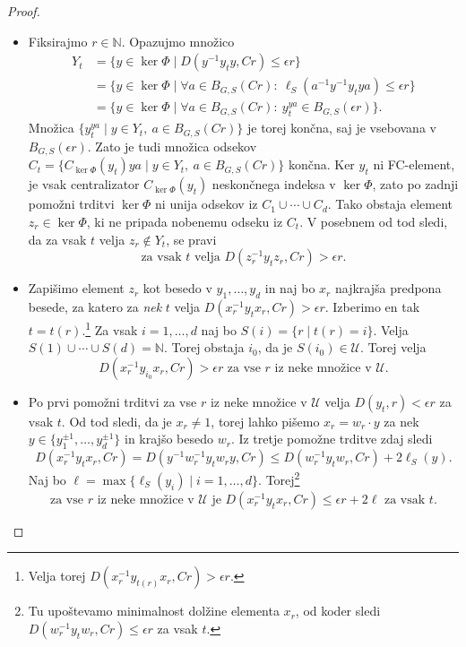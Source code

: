 \documentclass[11pt]{book}
\def\NN{\mathbb{N}}
\def\UU{\mathcal{U}}
\theoremstyle{definition}
\theoremstyle{zgled}
\theoremstyle{odprtproblem}
\theoremstyle{domacanaloga}
\newenvironment{dokaz}
    {\color{siva}\begin{proof}}
    {\end{proof}}
\theoremstyle{izrek}
\begin{document}
\begin{dokaz}
\begin{itemize}
    \item Fiksirajmo $r \in \NN$.  Opazujmo množico
    \begin{align*}
    Y_t &= \{ y \in \ker \Phi \mid D(y^{-1} y_t y, Cr) \leq \epsilon r \} \\
    &= \{ y \in \ker \Phi \mid \forall a \in B_{G,S}(Cr) \colon \ \ell_S(a^{-1} y^{-1} y_t y a) \leq \epsilon r \} \\
    &= \{ y \in \ker \Phi \mid \forall a \in B_{G,S}(Cr) \colon \ y_t^{ya} \in B_{G,S}(\epsilon r) \}.
    \end{align*}
    Množica $\{ y_t^{ya} \mid y \in Y_t, \ a \in B_{G,S}(Cr) \}$ je torej končna, saj je vsebovana v $B_{G,S}(\epsilon r)$. Zato je tudi množica odsekov $C_t = \{ C_{\ker \Phi}(y_t) ya \mid y \in Y_t, \ a \in B_{G,S}(Cr) \}$ končna. Ker $y_t$ ni FC-element, je vsak centralizator $C_{\ker \Phi}(y_t)$ neskončnega indeksa v $\ker \Phi$, zato po zadnji pomožni trditvi $\ker \Phi$ ni unija odsekov iz $C_1 \cup \cdots \cup C_d$. Tako obstaja element $z_r \in \ker \Phi$, ki ne pripada nobenemu odseku iz $C_t$. V posebnem od tod sledi, da za vsak $t$ velja $z_r \notin Y_t$, se pravi 
    \[
    \text{za vsak $t$ velja $D(z_r^{-1} y_t z_r, Cr) > \epsilon r$.}
    \]

    \item Zapišimo element $z_r$ kot besedo v $y_1, \dots, y_d$ in naj bo $x_r$ najkrajša predpona besede, za katero za {\em nek} $t$ velja $D(x_r^{-1} y_t x_r, Cr) > \epsilon r$. Izberimo en tak $t = t(r)$.\footnote{Velja torej $D(x_r^{-1} y_{t(r)} x_r, Cr) > \epsilon r$.} Za vsak $i = 1, \dots, d$ naj bo $S(i) = \{ r \mid t(r) = i \}$. Velja $S(1) \cup \cdots \cup S(d) = \NN$. Torej obstaja $i_0$, da je $S(i_0) \in \UU$. Torej velja
    \[
    \text{$D(x_r^{-1} y_{i_0} x_r, Cr) > \epsilon r$ za vse $r$ iz neke množice v $\UU$.}
    \]

    \item Po prvi pomožni trditvi za vse $r$ iz neke množice v $\UU$ velja $D(y_t, r) < \epsilon r$ za vsak $t$. Od tod sledi, da je $x_r \neq 1$, torej lahko pišemo $x_r = w_r \cdot y$ za nek $y \in \{ y_1^{\pm 1}, \dots, y_d^{\pm 1} \}$ in krajšo besedo $w_r$. Iz tretje pomožne trditve zdaj sledi
    \[
    D(x_r^{-1} y_t x_r, Cr) = D(y^{-1} w_r^{-1} y_t w_r y, Cr) \leq D(w_r^{-1} y_t w_r, Cr) + 2 \ell_S(y).
    \]
    Naj bo $\ell = \max \{ \ell_S(y_i) \mid i = 1, \dots, d \}$. Torej\footnote{Tu upoštevamo minimalnost dolžine elementa $x_r$, od koder sledi $D(w_r^{-1} y_t w_r, Cr) \leq \epsilon r$ za vsak $t$.} 
    \[
    \text{za vse $r$ iz neke množice v $\UU$ je }
    D(x_r^{-1} y_t x_r, Cr) 
    \leq \epsilon r
    + 2 \ell \text{ za vsak $t$.}
    \]


\end{itemize}
\end{dokaz}
\end{document}
